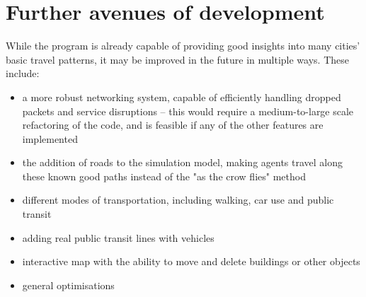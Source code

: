 \chapter{Further avenues of development}

While the program is already capable of providing good insights into many cities' basic travel patterns, it may be improved in the future in multiple ways. These include:
\begin{itemize}
    \item a more robust networking system, capable of efficiently handling dropped packets and service disruptions -- this would require a medium-to-large scale refactoring of the code, and is feasible if any of the other features are implemented
    \item the addition of roads to the simulation model, making agents travel along these known good paths instead of the "as the crow flies" method
    \item different modes of transportation, including walking, car use and public transit
    \item adding real public transit lines with vehicles 
    \item interactive map with the ability to move and delete buildings or other objects
    \item general optimisations
\end{itemize}